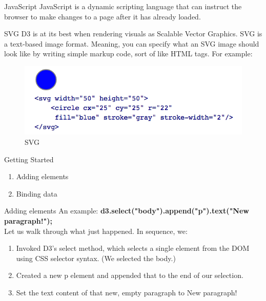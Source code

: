 \documentclass{beamer}
\begin{document}
\begin{frame}{JavaScript}
JavaScript is a dynamic scripting language that can instruct the browser to make changes to a page after it has already loaded.
\end{frame}

\begin{frame}{SVG}
D3 is at its best when rendering visuals as Scalable Vector Graphics. SVG is a text-based image format. Meaning, you can specify what an SVG image should look like by writing simple markup code, sort of like HTML tags. For example:
\begin{figure}
\centering
\includegraphics[width=1.0\textwidth]{./images/SVG.png}
\caption{\label{fig:samplemax} SVG}
\end{figure}

\end{frame}


\begin{frame}{Getting Started}
\begin{enumerate}
	\item Adding elements
	\item Binding data
\end{enumerate}
\end{frame}

\begin{frame}{Adding elements}
An example: \textbf{d3.select("body").append("p").text("New paragraph!");} \\
Let us walk through what just happened. In sequence, we:
\begin{enumerate}
	\item Invoked D3's select method, which selects a single element from the DOM using CSS selector syntax. (We selected the body.)
	\item Created a new p element and appended that to the end of our selection.
	\item Set the text content of that new, empty paragraph to New paragraph!
\end{enumerate} 
\end{frame}
\end{document}
